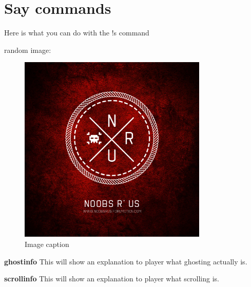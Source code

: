 \chapter{Say commands}
Here is what you can do with the !s command

random image:
\begin{figure}[ht!]
\centering
\includegraphics[width=90mm]{images/7dhe72E.jpg}
\caption{Image caption \label{overflow}}
\end{figure}

\textbf{ghostinfo}\newline
This will show an explanation to player what ghosting actually is.

\textbf{scrollinfo}\newline
This will show an explanation to player what scrolling is.
